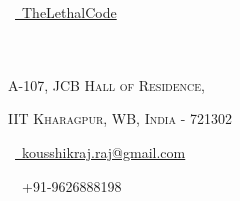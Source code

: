\documentclass[a4paper,10pt]{extarticle} %
\begin{document}
\pagestyle{empty} %

\begin{multicols}{3}
\normalsize \faGithub\ {\href{https://github.com/TheLethalCode}{\  TheLethalCode}}\\
\normalsize {}\\
\normalsize {}\\
\columnbreak
\normalsize\par{\par} %
\par{\centering\normalsize {\textsc{A-107, JCB Hall of Residence, }}\hfill\par}
\vspace{-0.2cm}
\par{\centering\normalsize {\textsc{IIT Kharagpur, WB, India - 721302 }}\hfill\par}

\columnbreak
\raggedright\hfill\normalsize \faEnvelope\ {\href{mailto:kousshikraj.raj@gmail.com}{\  kousshikraj.raj@gmail.com}}\\
\raggedright\hfill{\faPhone\ \  +91-9626888198}
\end{multicols}


\vspace{-0.7cm}
\end{document}
